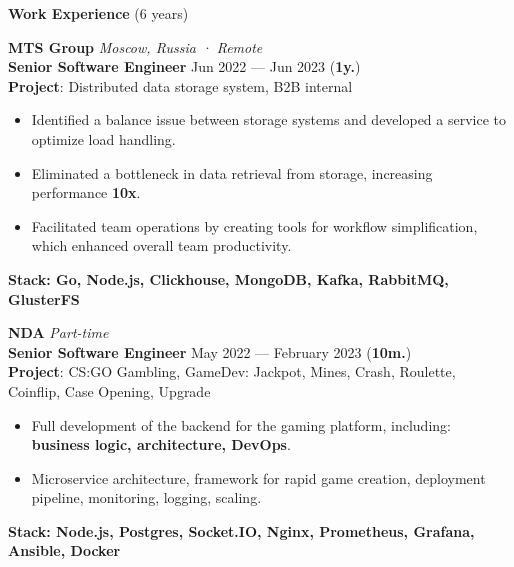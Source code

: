 \documentclass{resume}
\begin{document}
\begin{rSection}{\textbf{Work Experience} (6 years) }

\textbf{MTS Group} \hfill \textit{Moscow, Russia · Remote} \\
\textbf{Senior Software Engineer}  \hfill Jun 2022 --- Jun 2023 ({\textbf{1y.}}) \\
\textbf{Project}: Distributed data storage system, B2B internal
\begin{itemize}
    \item Identified a balance issue between storage systems and developed a service to optimize load handling\@.
    \item Eliminated a bottleneck in data retrieval from storage, increasing performance \textbf{10x}\@.
    \item Facilitated team operations by creating tools for workflow simplification, which enhanced overall team productivity\@.
\end{itemize}
\textbf{Stack: Go, Node.js, Clickhouse, MongoDB, Kafka, RabbitMQ, GlusterFS}

\textbf{NDA} \hfill \textit{Part-time} \\
\textbf{Senior Software Engineer}  \hfill May 2022 --- February 2023 ({\textbf{10m.}}) \\
\textbf{Project}: CS:GO Gambling, GameDev: Jackpot, Mines, Crash, Roulette, Coinflip, Case Opening, Upgrade
\begin{itemize}
    \item Full development of the backend for the gaming platform, including: \textbf{business logic, architecture, DevOps}\@.
    \item Microservice architecture, framework for rapid game creation, deployment pipeline, monitoring, logging, scaling\@.
\end{itemize}
\textbf{Stack: Node.js, Postgres, Socket.IO, Nginx, Prometheus, Grafana, Ansible, Docker}


\end{rSection}
\end{document}
